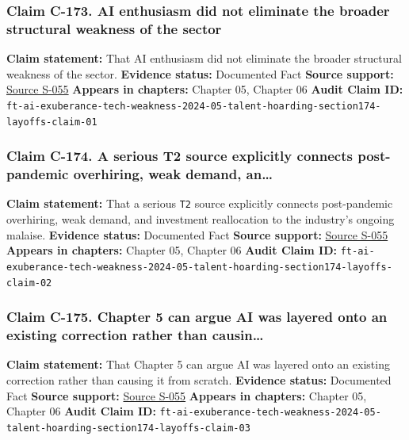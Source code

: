 \documentclass[
  american,
  11pt,
  letterpaper,
]{article}
\begin{document}
\subsubsection{Claim C-173. AI enthusiasm did not eliminate the broader
structural weakness of the
sector}\label{claim-c-173-ai-enthusiasm-did-not-eliminate-the-broader-structural-weakness-of-the-sector}

\textbf{Claim statement:} That AI enthusiasm did not eliminate the
broader structural weakness of the sector. \textbf{Evidence status:}
Documented Fact \textbf{Source support:}
\hyperref[source-s-055-ai-exuberance-masks-broad-weakness-in-tech-sector-say-investors]{Source
S-055} \textbf{Appears in chapters:} Chapter 05, Chapter 06
\textbf{Audit Claim ID:}
\texttt{ft-ai-exuberance-tech-weakness-2024-05-talent-hoarding-section174-layoffs-claim-01}

\subsubsection{Claim C-174. A serious T2 source explicitly connects
post-pandemic overhiring, weak demand,
an\ldots{}}\label{claim-c-174-a-serious-t2-source-explicitly-connects-post-pandemic-overhiring-weak-demand-an}

\textbf{Claim statement:} That a serious \texttt{T2} source explicitly
connects post-pandemic overhiring, weak demand, and investment
reallocation to the industry's ongoing malaise. \textbf{Evidence
status:} Documented Fact \textbf{Source support:}
\hyperref[source-s-055-ai-exuberance-masks-broad-weakness-in-tech-sector-say-investors]{Source
S-055} \textbf{Appears in chapters:} Chapter 05, Chapter 06
\textbf{Audit Claim ID:}
\texttt{ft-ai-exuberance-tech-weakness-2024-05-talent-hoarding-section174-layoffs-claim-02}

\subsubsection{Claim C-175. Chapter 5 can argue AI was layered onto an
existing correction rather than
causin\ldots{}}\label{claim-c-175-chapter-5-can-argue-ai-was-layered-onto-an-existing-correction-rather-than-causin}

\textbf{Claim statement:} That Chapter 5 can argue AI was layered onto
an existing correction rather than causing it from scratch.
\textbf{Evidence status:} Documented Fact \textbf{Source support:}
\hyperref[source-s-055-ai-exuberance-masks-broad-weakness-in-tech-sector-say-investors]{Source
S-055} \textbf{Appears in chapters:} Chapter 05, Chapter 06
\textbf{Audit Claim ID:}
\texttt{ft-ai-exuberance-tech-weakness-2024-05-talent-hoarding-section174-layoffs-claim-03}
\end{document}
